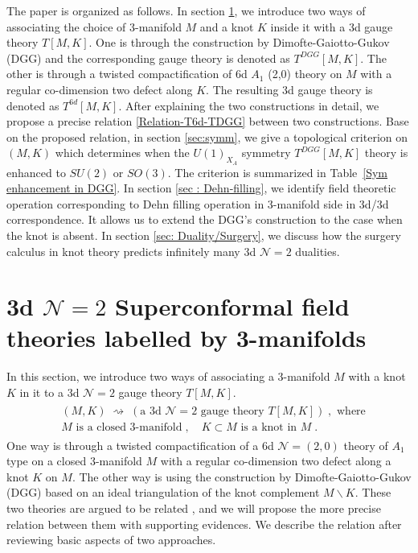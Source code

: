 \documentclass[a4paper,11pt]{article}
\begin{document}
The paper is organized as follows. In section \ref{sec:T[M]}, we introduce two ways of associating the choice of 3-manifold $M$ and a knot $K$ inside it with a 3d gauge theory $T[M,K]$. One is  through the construction by Dimofte-Gaiotto-Gukov \cite{Dimofte:2011ju} (DGG) and the corresponding gauge theory is denoted as $T^{DGG}[M,K]$. The other is through a twisted compactification of 6d $A_1$ (2,0) theory on $M$ with a regular co-dimension two defect along $K$. 
The resulting 3d gauge theory is denoted as $T^{6d}[M,K]$. After explaining the two constructions in detail, we propose a precise relation \eqref{Relation-T6d-TDGG} between two constructions. Base on the proposed relation, in section \ref{sec:symm},  we give a topological criterion on $(M,K)$ which determines when the $U(1)_{X_A}$ symmetry  $T^{DGG}[M,K]$ theory is enhanced to $SU(2)$ or $SO(3)$. The criterion is summarized in Table~\ref{Sym enhancement in DGG}. In section \ref{sec : Dehn-filling}, we identify field theoretic operation corresponding to Dehn filling operation in 3-manifold side in 3d/3d correspondence. It allows us to extend the DGG's construction to the case when the knot is absent. In section \ref{sec: Duality/Surgery}, we discuss how the surgery calculus in knot theory predicts infinitely many 3d $\mathcal{N}=2$ dualities. 




\section{3d $\mathcal{N}=2$ Superconformal field theories labelled by 3-manifolds}
\label{sec:T[M]}

In this section, we introduce two ways of associating a 3-manifold $M$ with a knot $K$ in it to a 3d $\mathcal{N}=2$ gauge theory $T[M,K]$.
%
\begin{align}
\begin{split}
&(M,K) \; \rightsquigarrow \; (\textrm{a 3d $\mathcal{N}=2$ gauge theory $T[M,K]$})\;, \textrm{ where}
\\
&\textrm{$M$ is a closed 3-manifold}\;, \quad\textrm{$K\subset M$ is a knot in $M$}\;.
\end{split}
\end{align}
%
One way is through a twisted compactification of a 6d $\mathcal{N}=(2,0)$ theory of $A_1$ type on a closed 3-manifold $M$ with a regular co-dimension two defect along a knot $K$ on $M$. The other way is using the construction  by Dimofte-Gaiotto-Gukov \cite{Dimofte:2011ju} (DGG) based on an ideal triangulation of the knot complement $M\backslash K$. 
These two theories are argued to be related \cite{Dimofte:2011ju}, and 
we will propose the more precise relation between them with supporting evidences.
We describe the relation after reviewing basic aspects of two approaches.
\end{document}
